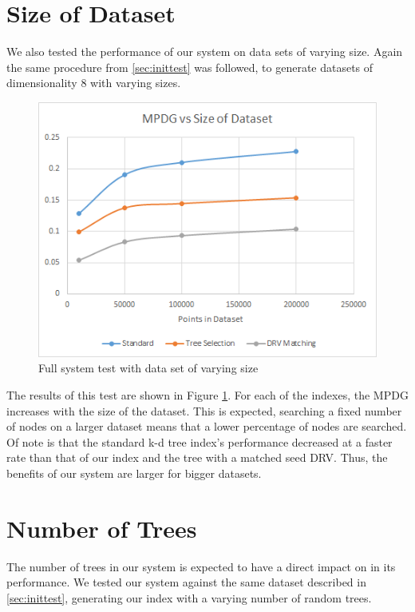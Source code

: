 \section{Size of Dataset}

We also tested the performance of our system on data sets of varying size.  Again the same procedure from \ref{sec:inittest} was followed, to generate datasets of dimensionality 8 with varying sizes.

\begin{figure}[h]
\begin{center}
\includegraphics[width=.85\textwidth]{Figures/size}
\end{center}
\caption{Full system test with data set of varying size}
\label{fig:size}
\end{figure}

The results of this test are shown in Figure \ref{fig:size}.  For each of the indexes, the MPDG increases with the size of the dataset.  This is expected, searching a fixed number of nodes on a larger dataset means that a lower percentage of nodes are searched.  Of note is that the standard k-d tree index's performance decreased at a faster rate than that of our index and the tree with a matched seed DRV.  Thus, the benefits of our system are larger for bigger datasets. 

\section{Number of Trees}

The number of trees in our system is expected to have a direct impact on in its performance.  We tested our system against the same dataset described in \ref{sec:inittest}, generating our index with a varying number of random trees.

